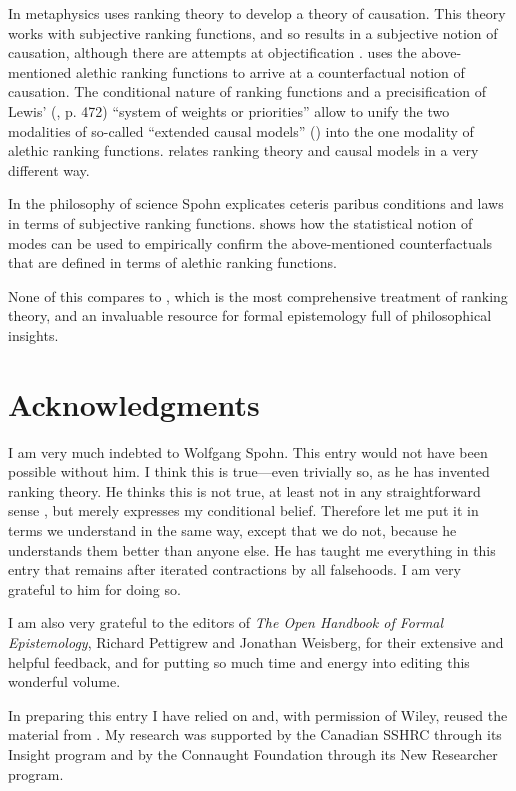 In metaphysics \citet{s83, s06b} uses ranking theory to develop a theory of causation. This theory works with subjective ranking functions, and so results in a subjective notion of causation, although there are attempts at objectification \citep[chapter 15]{s93,s12}. \citet{h11} uses the above-mentioned alethic ranking functions to arrive at a counterfactual notion of causation. The conditional nature of ranking functions and a precisification of Lewis' (, p. 472) ``system of weights or priorities'' allow \citet{h13a} to unify the two modalities of so-called ``extended causal models'' (\citealt{h08,hh10}) into the one modality of alethic ranking functions. \citet{s10b} relates ranking theory and causal models in a very different way.

In the philosophy of science Spohn explicates ceteris paribus conditions \citep{s02, s14} and laws \citep{s05} in terms of subjective ranking functions. \citet{h15b} shows how the statistical notion of modes can be used to empirically confirm the above-mentioned counterfactuals that are defined in terms of alethic ranking functions.

None of this compares to \citet{s12}, which is the most comprehensive treatment of ranking theory, and an invaluable resource for formal epistemology full of philosophical insights.


\section*{Acknowledgments}

I am very much indebted to Wolfgang Spohn. This entry would not have been possible without him. I think this is true---even trivially so, as he has invented ranking theory. He thinks this is not true, at least not in any straightforward sense \citep[section 8]{s15}, but merely expresses my conditional belief. Therefore let me put it in terms we understand in the same way, except that we do not, because he understands them better than anyone else. He has taught me everything in this entry that remains after iterated contractions by all falsehoods. I am very grateful to him for doing so.

I am also very grateful to the editors of \emph{The Open Handbook of Formal Epistemology}, Richard Pettigrew and Jonathan Weisberg, for their extensive and helpful feedback, and for putting so much time and energy into editing this wonderful volume.

In preparing this entry I have relied on and, with permission of Wiley, reused the material from \citet{h13b, h13c}. My research was supported by the Canadian SSHRC through its Insight program and by the Connaught Foundation through its New Researcher program.